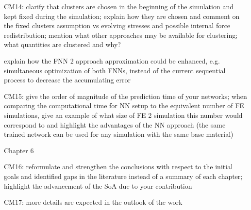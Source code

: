 CM14: clarify that clusters are chosen in the beginning of the simulation and kept
fixed during the simulation; explain how they are chosen and comment on the fixed
clusters assumption vs evolving stresses and possible internal force redistribution;
mention what other approaches may be available for clustering; what quantities are
clustered and why?

explain how the FNN 2 approach approximation could be enhanced, e.g.
simultaneous optimization of both FNNs, instead of the current sequential process
to decrease the accumulating error

CM15: give the order of magnitude of the prediction time of your networks; when
comparing the computational time for NN setup to the equivalent number of FE
simulations, give an example of what size of FE 2 simulation this number would
correspond to and highlight the advantages of the NN approach (the same trained
network can be used for any simulation with the same base material)

Chapter 6

CM16: reformulate and strengthen the conclusions with respect to the initial goals
and identified gaps in the literature instead of a summary of each chapter; highlight
the advancement of the SoA due to your contribution

CM17: more details are expected in the outlook of the work

